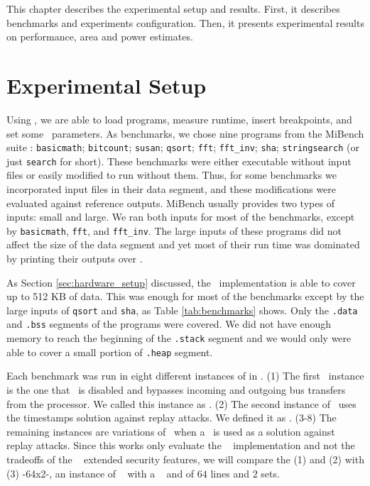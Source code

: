 

This chapter describes the experimental setup and results. First, it describes benchmarks and experiments configuration. Then, it presents experimental results on performance, area and power estimates.


\section{Experimental Setup}
\label{subsec:Experimental-Setup}

Using \grmon, we are able to load programs, measure runtime, insert breakpoints, and set some \leon~parameters. As benchmarks, we chose nine programs from the MiBench suite \cite{MiBench}: \texttt{basicmath}; \texttt{bitcount}; \texttt{susan}; \texttt{qsort}; \texttt{fft}; \texttt{fft\_inv}; \texttt{sha}; \texttt{stringsearch} (or just \texttt{search} for short). These benchmarks were either executable without input files or easily modified to run without them. Thus, for some benchmarks we incorporated input files in their data segment, and these modifications were evaluated against reference outputs. MiBench usually provides two types of inputs: small and large. We ran both inputs for most of the benchmarks, except by \texttt{basicmath}, \texttt{fft}, and \texttt{fft\_inv}. The large inputs of these programs did not affect the size of the data segment and yet most of their run time was dominated by printing their outputs over \grmon.

As Section \ref{sec:hardware_setup} discussed, the \cshia~implementation is able to cover up to 512 KB of data. This was enough for most of the benchmarks except by the large inputs of \texttt{qsort} and \texttt{sha}, as Table \ref{tab:benchmarks} shows. Only the \texttt{.data} and \texttt{.bss} segments of the programs were covered. We did not have enough memory to reach the beginning of the \texttt{.stack} segment and we would only were able to cover a small portion of \texttt{.heap} segment.

Each benchmark was run in eight different instances of \cshia in \cite{caio}. (1) The first \cshia~instance is the one that \handler~is disabled and bypasses incoming and outgoing bus transfers from the processor. We called this instance as \baseline. (2) The second instance of \cshia~uses the timestamps solution against replay attacks. We defined it as \timestamp. (3-8) The remaining instances are variations of \cshia~when a \mt~is used as a solution against replay attacks. Since this works only evaluate the \cshia~ implementation and not the tradeoffs of the \cshia~ extended security features, we will compare the (1) and (2) with (3) \cshiamt-64x2-\lru , an instance of \cshia~ with a \mt~ and \ptagcache of $64$ lines and $2$ sets.

